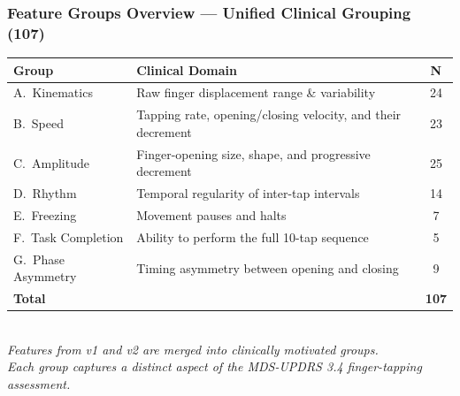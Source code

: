 \documentclass[aspectratio=169]{beamer}
\begin{document}
\begin{frame}
    \frametitle{Feature Groups Overview --- Unified Clinical Grouping (107)}
    \scriptsize\centering
    \begin{tabular}{llc}
        \toprule
        \textbf{Group} & \textbf{Clinical Domain} & \textbf{N} \\
        \midrule
        A.\ Kinematics          & Raw finger displacement range \& variability                     & 24 \\
        B.\ Speed               & Tapping rate, opening/closing velocity, and their decrement      & 23 \\
        C.\ Amplitude           & Finger-opening size, shape, and progressive decrement            & 25 \\
        D.\ Rhythm              & Temporal regularity of inter-tap intervals                       & 14 \\
        E.\ Freezing            & Movement pauses and halts                                        &  7 \\
        F.\ Task Completion     & Ability to perform the full 10-tap sequence                      &  5 \\
        G.\ Phase Asymmetry     & Timing asymmetry between opening and closing                     &  9 \\
        \midrule
        \textbf{Total} & & \textbf{107} \\
        \bottomrule
    \end{tabular}\\[0.5em]
    \scriptsize\itshape Features from v1 and v2 are merged into clinically motivated groups.\\
    Each group captures a distinct aspect of the MDS-UPDRS 3.4 finger-tapping assessment.
\end{frame}
\end{document}
